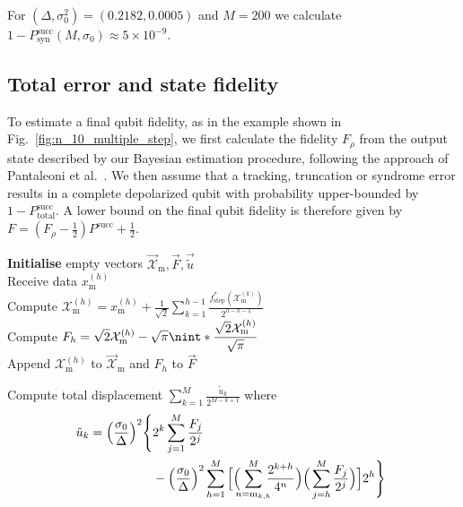 \documentclass[prx,reprint,superscriptaddress,longbibliography,floatfix,nofootinbib]{revtex4-1}
\DeclarePairedDelimiter{\nint}\lfloor\rceil
\begin{document}
For $(\Delta,\sigma_0^2) = (0.2182,0.0005)$ and $M=200$ we calculate $1-P^{\text{succ}}_{\text{syn}}(M,\sigma_0) \approx 5\times10^{-9}$.
\fi

\subsection{Total error and state fidelity}
To estimate a final qubit fidelity, as in the example shown in Fig.~\ref{fig:n_10_multiple_step}, we first calculate the fidelity $F_\rho$ from the output state described by our Bayesian estimation procedure, following the approach of Pantaleoni et al.~\cite{2019arXiv190708210P}. We then assume that a tracking, truncation or syndrome error results in a complete depolarized qubit with probability upper-bounded by $1-P^{\text{succ}}_\text{total}$. A lower bound on the final qubit fidelity is therefore given by $F = (F_\rho-\frac{1}{2})P^{\text{succ}}+\frac{1}{2}$.


\begin{algorithm}[!b]
\begin{algorithmic}
\Statex\textbf{Initialise} empty vectors $\vec{\mathcal{X}}_\text{m},\vec{F}, \vec{\tilde{u}}$
\\
        \Statex \qquad Receive data $x_{\text{m}}^{(h)}$
        \\
        \Statex \qquad Compute $\displaystyle \mathcal{X}_\text{m}^{(h)} = x_\text{m}^{(h)} + \frac{1}{\sqrt{2}}\sum_{k=1}^{h-1}\frac{f^{*}_{\text{step}}(\mathcal{X}_\text{m}^{(k)})}{2^{h-k-1}}$
        \Statex \qquad
        \\
        \Statex \qquad Compute $\displaystyle F_h = \sqrt{2}\mathcal{X}_\text{m}^{(h)}-\sqrt{\pi}\nint*{\frac{\sqrt{2}\mathcal{X}_\text{m}^{(h)}}{\sqrt{\pi}}}$
        \\
        \Statex \qquad Append $\mathcal{X}_{\text{m}}^{(h)}$ to $\vec{\mathcal{X}}_\text{m}$ and $F_h$ to $\vec{F}$
    \ENDFOR
    
    \Statex Compute total displacement $\displaystyle \sum_{k=1}^{M} \frac{\tilde{u}_k}{2^{M-k+1}}$
    where
    \\
    \begin{equation*}
    \begin{split}
    \tilde{u}_{k} = \Big(\frac{\sigma_0}{\Delta}\Big)^2 \Bigg\{& 2^{k}\sum_{j=1}^{M}\frac{F_j}{2^j} \\ 
    & - \Big(\frac{\sigma_0}{\Delta}\Big)^2\sum_{h=1}^{M}\Big[\Big(\hspace{-0.2cm}\sum_{n=\text{m}_{k,h}}^{M}\hspace{-0.2cm}\frac{2^{k+h}}{4^n}\Big)\Big(\sum_{j=h}^{M}\frac{F_j}{2^j}\Big)\Big]2^{h}\Bigg\} \  \end{split}
    \end{equation*}
\end{algorithmic}
\caption{Estimation of the q-quadrature error}
\label{algor:1}
\end{algorithm}
\end{document}

